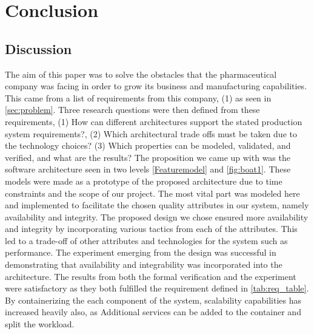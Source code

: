 \section{Conclusion}
\label{sec:conclusion}

\subsection{Discussion}
\label{sec:Discussion}
The aim of this paper was to solve the obstacles that the pharmaceutical company was facing in order to grow its business and manufacturing capabilities. This came from a list of requirements from this company, (1) as seen in \ref{sec:problem}. Three research questions were then defined from these requirements, (1) How can different architectures support the stated production system requirements?, (2) Which architectural trade offs must be taken due to the technology choices? (3) Which properties can be modeled, validated, and verified, and what are the results? The proposition we came up with was the software architecture seen in two levels \ref{Featuremodel} and \ref{fig:boat1}. These models were made as a prototype of the proposed architecture due to time constraints and the scope of our project. The most vital part was modeled here and implemented to facilitate the chosen quality attributes in our system, namely availability and integrity. The proposed design we chose ensured more availability and integrity by incorporating various tactics from each of the attributes. This led to a trade-off of other attributes and technologies for the system such as performance. The experiment emerging from the design was successful in demonstrating that availability and integrability was incorporated into the architecture. The results from both the formal verification and the experiment were satisfactory as they both fulfilled the requirement defined in \ref{tab:req_table}. By containerizing the each component of the system, scalability capabilities has increased heavily also, as Additional services can be added to the container and split the workload.  



